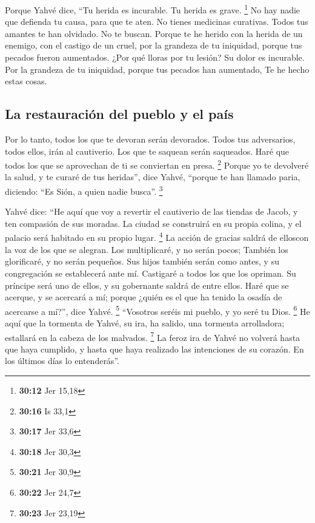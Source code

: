 \begin{paracol}{2}
 Porque Yahvé dice, ``Tu herida es incurable. Tu herida
es grave. \footnote{\textbf{30:12} Jer 15,18}  No hay
nadie que defienda tu causa, para que te aten. No tienes medicinas
curativas.  Todos tus amantes te han olvidado. No te
buscan. Porque te he herido con la herida de un enemigo, con el castigo
de un cruel, por la grandeza de tu iniquidad, porque tus pecados fueron
aumentados.  ¿Por qué lloras por tu lesión? Su dolor es
incurable. Por la grandeza de tu iniquidad, porque tus pecados han
aumentado, Te he hecho estas cosas.

\hypertarget{la-restauraciuxf3n-del-pueblo-y-el-pauxeds}{%
\subsection{La restauración del pueblo y el
país}\label{la-restauraciuxf3n-del-pueblo-y-el-pauxeds}}

 Por lo tanto, todos los que te devoran serán devorados.
Todos tus adversarios, todos ellos, irán al cautiverio. Los que te
saquean serán saqueados. Haré que todos los que se aprovechan de ti se
conviertan en presa. \footnote{\textbf{30:16} Is 33,1} 
Porque yo te devolveré la salud, y te curaré de tus heridas'', dice
Yahvé, ``porque te han llamado paria, diciendo: ``Es Sión, a quien nadie
busca''. \footnote{\textbf{30:17} Jer 33,6}

 Yahvé dice: ``He aquí que voy a revertir el cautiverio
de las tiendas de Jacob, y ten compasión de sus moradas. La ciudad se
construirá en su propia colina, y el palacio será habitado en su propio
lugar. \footnote{\textbf{30:18} Jer 30,3}  La acción de
gracias saldrá de elloscon la voz de los que se alegran. Los
multiplicaré, y no serán pocos; También los glorificaré, y no serán
pequeños.  Sus hijos también serán como antes, y su
congregación se establecerá ante mí. Castigaré a todos los que los
opriman.  Su príncipe será uno de ellos, y su gobernante
saldrá de entre ellos. Haré que se acerque, y se acercará a mí; porque
¿quién es el que ha tenido la osadía de acercarse a mí?'', dice Yahvé.
\footnote{\textbf{30:21} Jer 30,9}  ``Vosotros seréis mi
pueblo, y yo seré tu Dios. \footnote{\textbf{30:22} Jer 24,7}
 He aquí que la tormenta de Yahvé, su ira, ha salido, una
tormenta arrolladora; estallará en la cabeza de los malvados.
\footnote{\textbf{30:23} Jer 23,19}  La feroz ira de
Yahvé no volverá hasta que haya cumplido, y hasta que haya realizado las
intenciones de su corazón. En los últimos días lo entenderás''.


\end{paracol}
